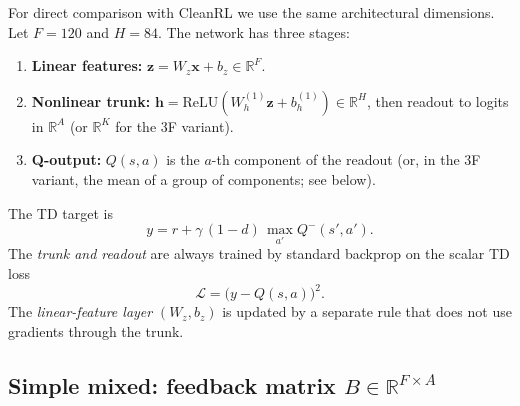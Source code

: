 \documentclass[11pt]{article}
\begin{document}
For direct comparison with CleanRL we use the same architectural dimensions. Let $F = 120$ and $H = 84$. The network has three stages:
\begin{enumerate}
\item \textbf{Linear features:} $\mathbf{z} = W_z \mathbf{x} + b_z \in \mathbb{R}^F$.
\item \textbf{Nonlinear trunk:} $\mathbf{h} = \mathrm{ReLU}(W_h^{(1)} \mathbf{z} + b_h^{(1)}) \in \mathbb{R}^H$, then readout to logits in $\mathbb{R}^A$ (or $\mathbb{R}^K$ for the 3F variant).
\item \textbf{Q-output:} $Q(s,a)$ is the $a$-th component of the readout (or, in the 3F variant, the mean of a group of components; see below).
\end{enumerate}
The TD target is
\begin{equation}
y = r + \gamma\,(1-d)\,\max_{a'} Q^-(s',a').
\end{equation}
The \emph{trunk and readout} are always trained by standard backprop on the scalar TD loss
\begin{equation}
\mathcal{L} = \bigl( y - Q(s,a) \bigr)^2.
\end{equation}
The \emph{linear-feature layer} $(W_z, b_z)$ is updated by a separate rule that does not use gradients through the trunk.

\subsection{Simple mixed: feedback matrix $B \in \mathbb{R}^{F \times A}$}
\end{document}
